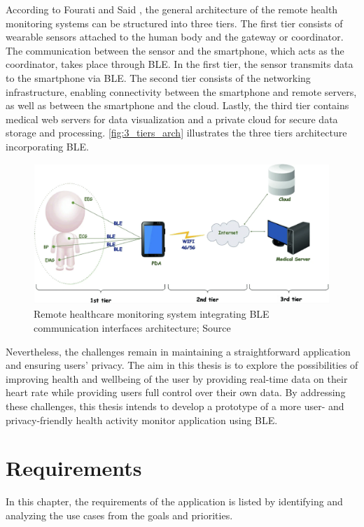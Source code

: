 According to Fourati and Said \autocite{chaari2020remote}, the general architecture of the remote health monitoring systems can be structured into three tiers.
The first tier consists of wearable sensors attached to the human body and the gateway or coordinator. The communication between the sensor and the smartphone, which acts as the coordinator, takes place through BLE. In the first tier, the sensor transmits data to the smartphone via BLE.
The second tier consists of the networking infrastructure, enabling connectivity between the smartphone and remote servers, as well as between the smartphone and the cloud. 
Lastly, the third tier contains medical web servers for data visualization and a private cloud for secure data storage and processing. 
\autoref{fig:3_tiers_arch} illustrates the three tiers architecture incorporating BLE.
\begin{figure}[H]
  \centering
  \includegraphics[width=1\textwidth]{images/3-tiers-arch.png}
  \caption{Remote healthcare monitoring system integrating BLE communication interfaces architecture; Source \autocite{chaari2020remote}}
  \label{fig:3_tiers_arch}
\end{figure}

Nevertheless, the challenges remain in maintaining a straightforward application and ensuring users' privacy. The aim in this thesis is to explore the possibilities of improving health and wellbeing of the user by providing real-time data on their heart rate while providing users full control over their own data.
By addressing these challenges, this thesis intends to develop a prototype of a more user- and privacy-friendly health activity monitor application using BLE.
\newpage

\section{Requirements}
\label{chap:requirements}
In this chapter, the requirements of the application is listed by identifying and analyzing the use cases from the goals and priorities.

